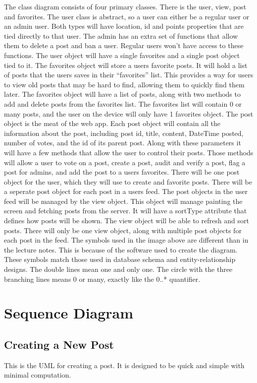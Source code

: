 \documentclass[12pt]{article}
\begin{document}
The class diagram consists of four primary classes.  There is the user, view, post and favorites.  The user class is abstract, so a user can either be a regular user or an admin user.  Both types will have location, id and points properties that are tied directly to that user.  The admin has an extra set of functions that allow them to delete a post and ban a user.  Regular users won’t have access to these functions.  The user object will have a single favorites and a single post object tied to it.
The favorites object will store a users favorite posts.  It will hold a list of posts that the users saves in their “favorites” list.  This provides a way for users to view old posts that may be hard to find, allowing them to quickly find them later.  The favorites object will have a list of posts, along with two methods to add and delete posts from the favorites list.  The favorites list will contain 0 or many posts, and the user on the device will only have 1 favorites object.
The post object is the meat of the web app.  Each post object will contain all the information about the post, including post id, title, content, DateTime posted, number of votes, and the id of its parent post.  Along with these parameters it will have a few methods that allow the user to control their posts.  Those methods will allow a user to vote on a post, create a post, audit and verify a post, flag a post for admins, and add the post to a users favorites.  There will be one post object for the user, which they will use to create and favorite posts.  There will be a seperate post object for each post in a users feed.
The post objects in the user feed will be managed by the view object.  This object will manage painting the screen and fetching posts from the server.  It will have a sortType attribute that defines how posts will be shown.  The view object will be able to refresh and sort posts.  There will only be one view object, along with multiple post objects for each post in the feed.
The symbols used in the image above are different than in the lecture notes.  This is because of the software used to create the diagram.  These symbols match those used in database schema and entity-relationship designs.  The double lines mean one and only one.  The circle with the three branching lines means 0 or many, exactly like the 0..* quantifier.

\section{Sequence Diagram}
\subsection{Creating a New Post}
This is the UML for creating a post. It is designed to be quick and simple with minimal computation.
\end{document}
